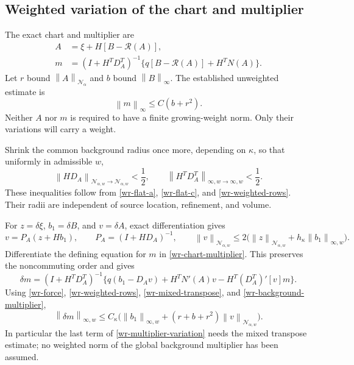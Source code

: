 \documentclass[11pt]{article}
\theoremstyle{remark}\newtheorem{remark}[theorem]{Remark}
\newcommand{\norm}[1]{\left\lVert#1\right\rVert}
\begin{document}
\subsection{Weighted variation of the chart and multiplier}
\label{wr-variation}

The exact chart and multiplier are
\begin{equation}\label{wr-chart-multiplier}
 \begin{split}
 A&=\xi+H[B-\mathcal R(A)],\\
 m&=(I+H^TD_A^T)^{-1}
             \{q[B-\mathcal R(A)]+H^TN(A)\}.
 \end{split}
\end{equation}
Let $r$ bound $\norm{A}_{\mathcal N_\alpha}$ and $b$ bound
$\norm{B}_\infty$. The established unweighted estimate is
\begin{equation}\label{wr-background-multiplier}
 \norm{m}_\infty\le C(b+r^2).
\end{equation}
Neither $A$ nor $m$ is required to have a finite growing-weight
norm. Only their variations will carry a weight.

Shrink the common background radius once more, depending on
$\kappa$, so that uniformly in admissible $w$,
\begin{equation}\label{wr-inverse-smallness}
 \norm{HD_A}_{\mathcal N_{\alpha,w}\to\mathcal N_{\alpha,w}}<\frac12,
 \qquad
 \norm{H^TD_A^T}_{\infty,w\to\infty,w}<\frac12.
\end{equation}
These inequalities follow from \eqref{wr-flat-a},
\eqref{wr-flat-c}, and \eqref{wr-weighted-rows}. Their radii
are independent of source location, refinement, and volume.

For $z=\delta\xi$, $b_1=\delta B$, and $v=\delta A$, exact
differentiation gives
\begin{equation}\label{wr-chart-variation}
 v=P_A(z+Hb_1),\qquad P_A=(I+HD_A)^{-1},\qquad
 \norm{v}_{\mathcal N_{\alpha,w}}
 \le2\bigl(\norm{z}_{\mathcal N_{\alpha,w}}
                       +h_\kappa\norm{b_1}_{\infty,w}\bigr).
\end{equation}
Differentiate the defining equation for $m$ in
\eqref{wr-chart-multiplier}. This preserves the noncommuting
order and gives
\begin{equation}\label{wr-multiplier-variation}
 \boxed{\quad
 \delta m=(I+H^TD_A^T)^{-1}
 \{q(b_1-D_Av)+H^TN'(A)v-H^T(D_A^T)'[v]m\}.
 \quad}
\end{equation}
Using \eqref{wr-force}, \eqref{wr-weighted-rows},
\eqref{wr-mixed-transpose}, and
\eqref{wr-background-multiplier},
\begin{equation}\label{wr-multiplier-variation-bound}
 \norm{\delta m}_{\infty,w}
 \le C_\kappa\bigl(\norm{b_1}_{\infty,w}
        +(r+b+r^2)\norm{v}_{\mathcal N_{\alpha,w}}\bigr).
\end{equation}
In particular the last term of
\eqref{wr-multiplier-variation} needs the mixed transpose
estimate; no weighted norm of the global background multiplier
has been assumed.
\end{document}
